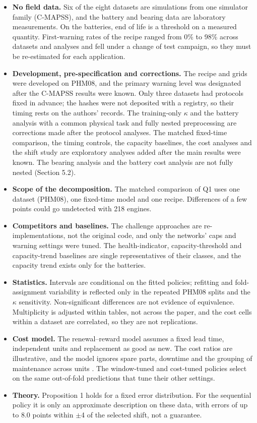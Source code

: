 \documentclass[a4paper,fleqn,doubleblind]{cas-dc}
\begin{document}
\begin{itemize}[leftmargin=1.2em,itemsep=2pt]
\item \textbf{No field data.} Six of the eight datasets are simulations from one simulator family (C-MAPSS), and the battery and bearing data are laboratory measurements. On the batteries, end of life is a threshold on a measured quantity. First-warning rates of the recipe ranged from 0\% to 98\% across datasets and analyses and fell under a change of test campaign, so they must be re-estimated for each application.
\item \textbf{Development, pre-specification and corrections.} The recipe and grids were developed on PHM08, and the primary warning level was designated after the C-MAPSS results were known. Only three datasets had protocols fixed in advance; the hashes were not deposited with a registry, so their timing rests on the authors' records. The training-only $\kappa$ and the battery analysis with a common physical task and fully nested preprocessing are corrections made after the protocol analyses. The matched fixed-time comparison, the timing controls, the capacity baselines, the cost analyses and the shift study are exploratory analyses added after the main results were known. The bearing analysis and the battery cost analysis are not fully nested (Section 5.2).
\item \textbf{Scope of the decomposition.} The matched comparison of Q1 uses one dataset (PHM08), one fixed-time model and one recipe. Differences of a few points could go undetected with 218 engines.
\item \textbf{Competitors and baselines.} The challenge approaches are re-implementations, not the original code, and only the networks' caps and warning settings were tuned. The health-indicator, capacity-threshold and capacity-trend baselines are single representatives of their classes, and the capacity trend exists only for the batteries.
\item \textbf{Statistics.} Intervals are conditional on the fitted policies; refitting and fold-assignment variability is reflected only in the repeated PHM08 splits and the $\kappa$ sensitivity. Non-significant differences are not evidence of equivalence. Multiplicity is adjusted within tables, not across the paper, and the cost cells within a dataset are correlated, so they are not replications.
\item \textbf{Cost model.} The renewal--reward model assumes a fixed lead time, independent units and replacement as good as new. The cost ratios are illustrative, and the model ignores spare parts, downtime and the grouping of maintenance across units \cite{depater2022,mitici2023}. The window-tuned and cost-tuned policies select on the same out-of-fold predictions that tune their other settings.
\item \textbf{Theory.} Proposition 1 holds for a fixed error distribution. For the sequential policy it is only an approximate description on these data, with errors of up to 8.0 points within $\pm$4 of the selected shift, not a guarantee.
\end{itemize}
\end{document}
